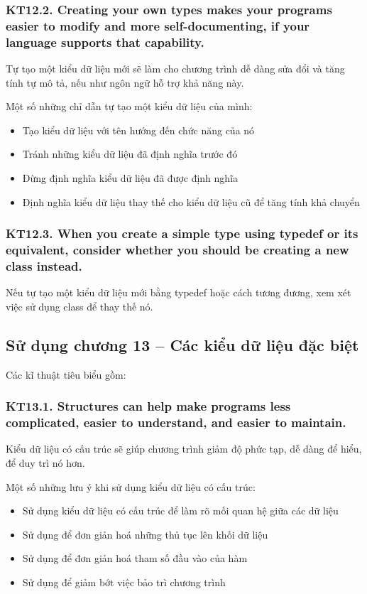 \documentclass[12pt]{report}
\begin{document}
\subsubsection{KT12.2. Creating your own types makes your programs easier to modify and more self-documenting, if your language supports that capability.}
Tự tạo một kiểu dữ liệu mới sẽ làm cho chương trình dễ dàng sửa đổi và tăng tính tự mô tả, nếu như ngôn ngữ hỗ trợ khả năng này.

\noindent Một số những chỉ dẫn tự tạo một kiểu dữ liệu của mình: 
\begin{itemize}
	\item Tạo kiểu dữ liệu với tên hướng đến chức năng của nó 
	\item Tránh những kiểu dữ liệu đã định nghĩa trước đó 
	\item Đừng định nghĩa kiểu dữ liệu đã được định nghĩa 
	\item Định nghĩa kiểu dữ liệu thay thế cho kiểu dữ liệu cũ để tăng tính khả chuyển 
\end{itemize}



\subsubsection{KT12.3. When you create a simple type using typedef or its equivalent, consider whether you should be creating a new class instead.}
Nếu tự tạo một kiểu dữ liệu mới bằng typedef hoặc cách tương đương, xem xét việc sử dụng class để thay thế nó.


\subsection{Sử dụng chương 13 – Các kiểu dữ liệu đặc biệt}
\noindent Các kĩ thuật tiêu biểu gồm:

\subsubsection{KT13.1. Structures can help make programs less complicated, easier to understand, and easier to maintain.}
Kiểu dữ liệu có cấu trúc sẽ giúp chương trình giảm độ phức tạp, dễ dàng để hiểu, để duy trì nó hơn.
 
\noindent Một số những lưu ý khi sử dụng kiểu dữ liệu có cấu trúc: 
\begin{itemize}
	\item Sử dụng kiểu dữ liệu có cấu trúc để làm rõ mối quan hệ giữa các dữ liệu 
	\item Sử dụng để đơn giản hoá những thủ tục lên khối dữ liệu 
	\item Sử dụng để đơn giản hoá tham số đầu vào của hàm 
	\item Sử dụng để giảm bớt việc bảo trì chương trình
\end{itemize}
\end{document}

